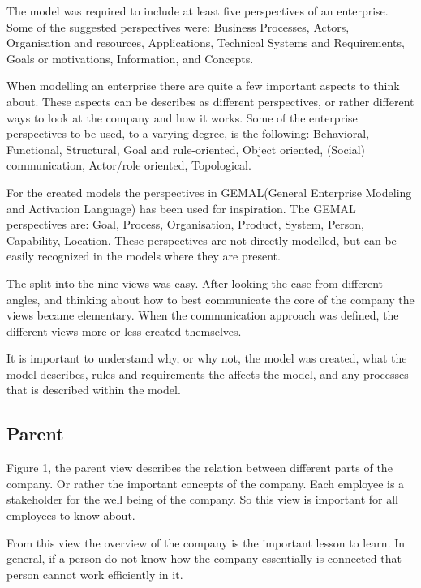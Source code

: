 \documentclass[12pt, a4paper]{article}
\begin{document}
The model was required to include at least five perspectives of an enterprise.
Some of the suggested perspectives were: Business Processes, Actors,
Organisation and resources, Applications, Technical Systems and Requirements,
Goals or motivations, Information, and Concepts. 

When modelling an enterprise there are quite a few important aspects to think
about. These aspects can be describes as different perspectives, or rather
different ways to look at the company and how it works. Some of the enterprise
perspectives to be used, to a varying degree, is the following: Behavioral,
Functional, Structural, Goal and rule-oriented, Object oriented, (Social)
communication, Actor/role oriented, Topological. 

For the created models the perspectives in GEMAL(General Enterprise Modeling and
Activation Language) has been used for inspiration. The GEMAL perspectives are:
Goal, Process, Organisation, Product, System, Person, Capability, Location.
These perspectives are not directly modelled, but can be easily recognized in
the models where they are present.  

The split into the nine views was easy. After looking the case from different
angles, and thinking about how to best communicate the core of the company the
views became elementary. When the communication approach was defined, the
different views more or less created themselves.  

It is important to understand why, or why not, the model was created, what the
model describes, rules and requirements the affects the model, and any
processes that is described within the model. 

\subsection{Parent}
Figure 1, the parent view describes the relation between different parts of the
company. Or rather the important concepts of the company.   
Each employee is a stakeholder for the well being of the company. So this view
is important for all employees to know about.  

From this view the overview of the company is the important lesson to learn. In
general, if a person do not know how the company essentially is connected that
person cannot work efficiently in it. 
\end{document}
